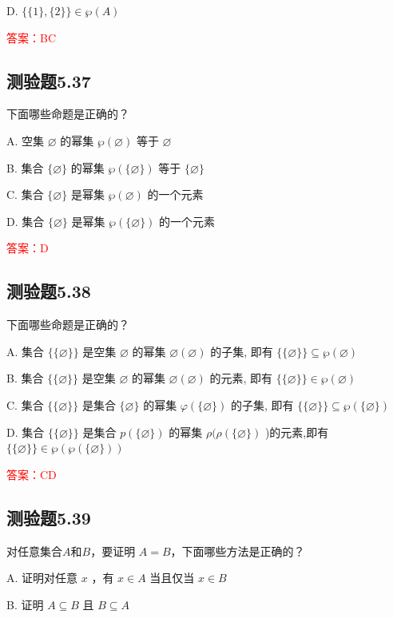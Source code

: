 \documentclass[UTF8, heading=true]{ctexart}
\begin{document}
D. $\{\{1\},\{2\}\} \in \wp(A)$

\textcolor{red}{答案：BC}



\subsection{测验题5.37}

下面哪些命题是正确的？

A. 
空集 $\varnothing$ 的幂集 $\wp(\varnothing)$ 等于 $\varnothing$

B. 
集合 $\{\varnothing\}$ 的幂集 $\wp(\{\varnothing\})$ 等于 $\{\varnothing\}$

C. 
集合 $\{\varnothing\}$ 是幂集 $\wp(\varnothing)$ 的一个元素

D. 
集合 $\{\varnothing\}$ 是幂集 $\wp(\{\varnothing\})$ 的一个元素

\textcolor{red}{答案：D}

\subsection{测验题5.38}

下面哪些命题是正确的？

A. 
集合 $\{\{\varnothing\}\}$ 是空集 $\varnothing$ 的幂集 $\varnothing(\varnothing)$ 的子集, 即有 $\{\{\varnothing\}\} \subseteq \wp(\varnothing)$

B. 
集合 $\{\{\varnothing\}\}$ 是空集 $\varnothing$ 的幂集 $\varnothing(\varnothing)$ 的元素, 即有 $\{\{\varnothing\}\} \in \wp(\varnothing)$

C. 
集合 $\{\{\varnothing\}\}$ 是集合 $\{\varnothing\}$ 的幂集 $\varphi(\{\varnothing\})$ 的子集, 即有 $\{\{\varnothing\}\} \subseteq \wp(\{\varnothing\})$

D. 
集合 $\{\{\varnothing\}\}$ 是集合 $p(\{\varnothing\})$ 的幂集 $\rho(\rho(\{\varnothing\})$ )的元素,即有 $\{\{\varnothing\}\} \in \wp(\wp(\{\varnothing\}))$

\textcolor{red}{答案：CD}

\subsection{测验题5.39}

对任意集合$A$和$B$，要证明
$A=B$，下面哪些方法是正确的？

A. 证明对任意 $x$ ，有 $x \in A$ 当且仅当 $x \in B$

B. 证明 $A \subseteq B$ 且 $B \subseteq A$
\end{document}
